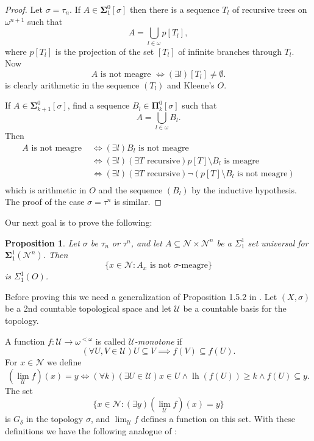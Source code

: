\documentclass[11pt, english]{article}
\newtheorem{prop}{Proposition}
\DeclareMathOperator{\lh}{lh} \DeclareMathOperator{\inn}{Inn}
\newcommand{\baire}{\mathscr N}
\def\bSigma{{\boldsymbol{\Sigma}}}
\def\bPi{{\boldsymbol{\Pi}}}
\begin{document}
\begin{proof}
Let $\sigma=\tau_n$. If $A\in\bSigma^0_1[\sigma]$ then there is a
sequence $T_l$ of recursive trees on $\omega^{n+1}$ such that
$$
A=\bigcup_{l\in\omega} p[T_l],
$$
where $p[T_l]$ is the projection of the set $[T_l]$ of infinite branches through $T_l$. Now
$$
A\text{ is not meagre }\iff (\exists l) [T_l]\neq\emptyset.
$$
is clearly arithmetic in the sequence $(T_l)$ and Kleene's $O$.

If $A\in\bSigma^0_{k+1}[\sigma]$, find a sequence
$B_l\in\bPi^0_k[\sigma]$ such that
$$
A=\bigcup_{l\in\omega} B_l.
$$
Then
\begin{align*}
A\text{ is not meagre }&\iff (\exists l) B_l \text{ is not meagre}\\
&\iff (\exists l)(\exists T\text{ recursive}) p[T]\setminus B_l \text{ is meagre}\\
&\iff(\exists l)(\exists T\text{ recursive}) \neg (p[T]\setminus B_l \text{ is not meagre})\\
\end{align*}
which is arithmetic in $O$ and the sequence $(B_l)$ by the
inductive hypothesis. The proof of the case $\sigma=\tau^n$ is
similar.
\end{proof}

Our next goal is to prove the following:

\begin{prop}
Let $\sigma$ be $\tau_n$ or $\tau^n$, and let
$A\subseteq\baire\times\baire^n$ be a $\Sigma^1_1$ set universal
for $\bSigma^1_1(\baire^n)$. Then
$$
\{x\in\baire: A_x \text{ is not } \sigma\text{-meagre}\}
$$
is $\Sigma^1_1(O)$.\label{sigma11prop}
\end{prop}

Before proving this we need a generalization of Proposition 1.5.2
in \cite{kechris73}. Let $(X,\sigma)$ be a 2nd countable
topological space and let $\mathcal U$ be a countable basis for
the topology.

A function $f:\mathcal U\to\omega^{<\omega}$ is called {\it
$\mathcal U$-monotone} if
$$
(\forall U,V\in\mathcal U) U\subseteq V\implies f(V)\subseteq
f(U).
$$
For $x\in\baire$ we define
$$
(\lim_{\mathcal U} f)(x)=y\iff (\forall k)(\exists U\in\mathcal U)
x\in U\wedge \lh(f(U))\geq k\wedge f(U)\subseteq y.
$$
The set
$$
\{x\in\baire: (\exists y)(\lim_{\mathcal U} f) (x)=y\}
$$
is $G_\delta$ in the topology $\sigma$, and $\lim_{\mathcal U} f$
defines a function on this set. With these definitions we have the
following analogue of \cite[Proposition 1.5.2]{kechris73}:
\end{document}
